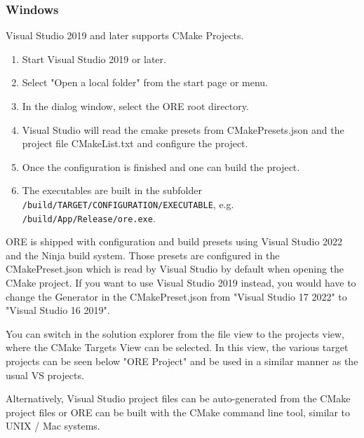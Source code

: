\subsubsection*{Windows}

Visual Studio 2019 and later supports CMake Projects.

\begin{enumerate}
\item Start Visual Studio 2019 or later.
\item Select "Open a local folder" from the start page or menu.
\item In the dialog window, select the ORE root directory.
\item Visual Studio will read the cmake presets from CMakePresets.json and the project file CMakeList.txt and configure the project.
\item Once the configuration is finished and one can build the project.
\item The executables are built in the subfolder {\tt /build/TARGET/CONFIGURATION/EXECUTABLE}, e.g. {\tt /build/App/Release/ore.exe}.
\end{enumerate}

ORE is shipped with configuration and build presets using Visual Studio 2022 and the Ninja build system. Those presets are configured in the CMakePreset.json which is read by Visual Studio by default when opening the CMake project. If you want to use Visual Studio 2019 instead, you would have to change the Generator in the CMakePreset.json from "Visual Studio 17 2022" to "Visual Studio 16 2019".

You can switch in the solution explorer from the file view to the projects view, where the CMake Targets View can be selected. In this view, the various target projects can be seen below "ORE Project" and be used in a similar manner as the usual VS projects.

\medskip

Alternatively, Visual Studio project files can be auto-generated from the CMake project files or ORE can be built with the CMake command line tool, similar to UNIX / Mac systems.

